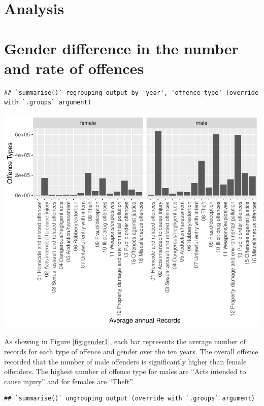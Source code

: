 \documentclass[11pt,a4paper,]{article}
\let\origfigure\figure
\let\endorigfigure\endfigure
\renewenvironment{figure}[1][2] {
\expandafter\origfigure\expandafter[H]
} {
\endorigfigure
}
\begin{document}
\newpage

\hypertarget{analysis}{%
\section{Analysis}\label{analysis}}

\section*{Gender difference in the number and rate of offences}

\begin{verbatim}
## `summarise()` regrouping output by 'year', 'offence_type' (override with `.groups` argument)
\end{verbatim}

\begin{figure}
\centering
\includegraphics{ETC5513-Assignment4_files/figure-latex/gender1-1.pdf}
\caption{\label{fig:gender1}Yearly average offence records of different offence type}
\end{figure}

As showing in Figure \ref{fig:gender1}, each bar represents the average number of records for each type of offence and gender over the ten years. The overall offence recorded that the number of male offenders is significantly higher than female offenders. The highest number of offence type for males are ``Acts intended to cause injury'' and for females are ``Theft''.

\begin{verbatim}
## `summarise()` ungrouping output (override with `.groups` argument)
\end{verbatim}
\end{document}
